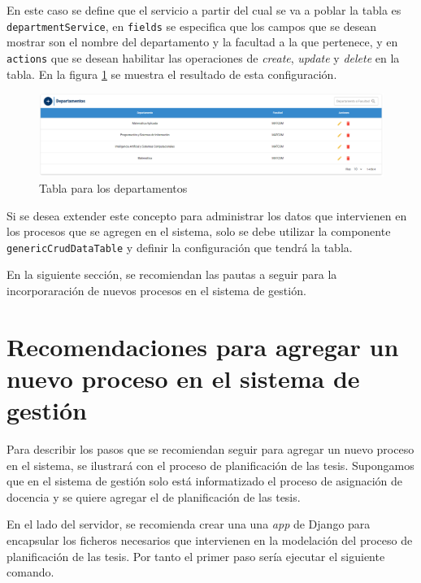 En este caso se define que el servicio a partir del cual se 
va a poblar la tabla es \texttt{departmentService}, en \texttt{fields}
se especifica que los campos que se desean 
mostrar son el nombre del departamento y la facultad a la que pertenece, y en 
\texttt{actions} que se desean habilitar las operaciones 
de \textit{create}, \textit{update} y \textit{delete} en la tabla. En la 
figura \ref{cap5-table-department} se muestra el resultado de esta configuración.

\begin{figure}[H]
    \centering
    \includegraphics[scale=0.3]{Graphics/Extensibility/department-table.png}
    \caption{Tabla para los departamentos}
    \label{cap5-table-department}
\end{figure}


Si se desea extender este concepto para administrar los datos que intervienen
en los procesos que se agregen en el sistema,
solo se debe utilizar la componente \texttt{genericCrudDataTable}
y definir la configuración que tendrá la tabla.



En la siguiente sección, se recomiendan las pautas a seguir para la incorporaración 
de nuevos procesos en el sistema de gestión.

\section{Recomendaciones para agregar un nuevo proceso en el sistema de gestión}\label{cap5:recommendations}
Para describir los pasos que se recomiendan seguir para agregar un nuevo proceso en el sistema,
se ilustrará con el proceso de planificación de las tesis. Supongamos que en el 
sistema de gestión solo está informatizado el proceso de asignación de docencia y se 
quiere agregar el de planificación de las tesis.

En el lado del servidor,
se recomienda crear una una \textit{app} de Django para encapsular los ficheros necesarios 
que intervienen en la modelación del proceso de planificación de las tesis.
Por tanto el primer paso sería ejecutar el siguiente comando.

